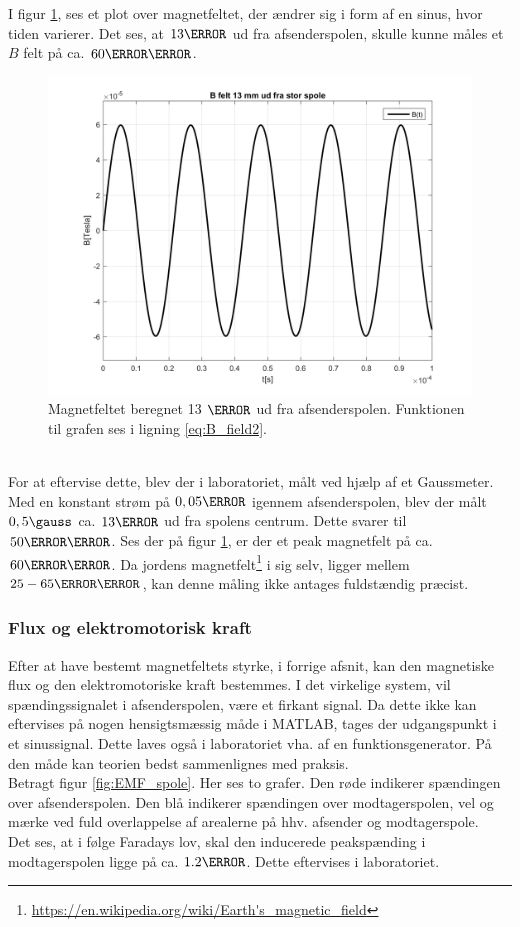 I figur \ref{fig:B_felt_stor_spole}, ses et plot over magnetfeltet, der ændrer sig i form af en sinus, hvor tiden varierer.
Det ses, at $13\mm$ ud fra afsenderspolen, skulle kunne måles et $B$ felt på ca. $60\micro\tesla$.\\
\begin{figure}[h!]
	\centering
	\includegraphics[width=1\textwidth]{billeder/B_felt_stor_spole.png}
	\caption{Magnetfeltet beregnet 13 $\mm$ ud fra afsenderspolen. Funktionen til grafen ses i ligning \ref{eq:B_field2}.}
	\label{fig:B_felt_stor_spole}
\end{figure}\\
For at eftervise dette, blev der i laboratoriet, målt ved hjælp af et Gaussmeter.
Med en konstant strøm på $0,05\ampere$ igennem afsenderspolen, blev der målt $0,5 \gauss$ ca. $13\mm$ ud fra spolens centrum. 
Dette svarer til $50 \micro\tesla$. 
Ses der på figur \ref{fig:B_felt_stor_spole}, er der et peak magnetfelt på ca. $60\micro\tesla$.
Da jordens magnetfelt\footnote{\url{https://en.wikipedia.org/wiki/Earth's_magnetic_field}} i sig selv, ligger mellem $25-65\micro\tesla$, kan denne måling ikke antages fuldstændig præcist.

\subsubsection{Flux og elektromotorisk kraft}
Efter at have bestemt magnetfeltets styrke, i forrige afsnit, kan den magnetiske flux og den elektromotoriske kraft bestemmes.
I det virkelige system, vil spændingssignalet i afsenderspolen, være et firkant signal.
Da dette ikke kan eftervises på nogen hensigtsmæssig måde i MATLAB, tages der udgangspunkt i et sinussignal.
Dette laves også i laboratoriet vha. af en funktionsgenerator.
På den måde kan teorien bedst sammenlignes med praksis.\\
Betragt figur \ref{fig:EMF_spole}. Her ses to grafer.
Den røde indikerer spændingen over afsenderspolen.
Den blå indikerer spændingen over modtagerspolen, vel og mærke ved fuld overlappelse af arealerne på hhv. afsender og modtagerspole.\\
Det ses, at i følge Faradays lov, skal den inducerede peakspænding i modtagerspolen ligge på ca. $1.2\volt$.
Dette eftervises i laboratoriet.

